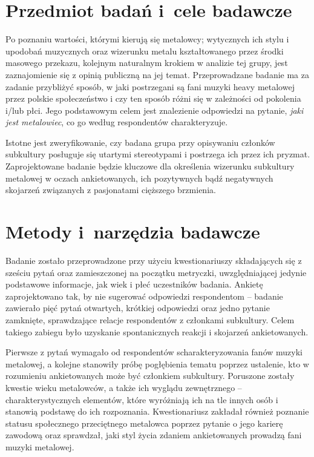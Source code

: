 \documentclass[12pt, a4paper, titlepage]{report}
\begin{document}
\section{Przedmiot badań i~cele badawcze}
Po poznaniu wartości, którymi kierują się metalowcy; wytycznych ich stylu i upodobań muzycznych oraz wizerunku metalu kształtowanego przez środki masowego przekazu, kolejnym naturalnym krokiem w analizie tej grupy, jest zaznajomienie się z opinią publiczną na jej temat. Przeprowadzane badanie ma za zadanie przybliżyć sposób, w jaki postrzegani są fani muzyki heavy metalowej przez polskie społeczeństwo i czy ten sposób różni się w zależności od pokolenia i/lub płci. Jego podstawowym celem jest znalezienie odpowiedzi na pytanie, \emph{jaki jest metalowiec}, co go według respondentów charakteryzuje. 

Istotne jest zweryfikowanie, czy badana grupa przy opisywaniu członków subkultury posługuje się utartymi stereotypami i postrzega ich przez ich pryzmat. Zaprojektowane badanie będzie kluczowe dla określenia wizerunku subkultury metalowej w oczach ankietowanych, ich pozytywnych bądź negatywnych skojarzeń związanych z pasjonatami cięższego brzmienia. 

\section{Metody i~narzędzia badawcze}
Badanie zostało przeprowadzone przy użyciu kwestionariuszy składających się z sześciu pytań oraz zamieszczonej na początku metryczki, uwzględniającej jedynie podstawowe informacje, jak wiek i płeć uczestników badania. Ankietę zaprojektowano tak, by nie sugerować odpowiedzi respondentom -- badanie zawierało pięć pytań otwartych, krótkiej odpowiedzi oraz jedno pytanie zamknięte, sprawdzające relacje respondentów z członkami subkultury. Celem takiego zabiegu było uzyskanie spontanicznych reakcji i skojarzeń ankietowanych. 

Pierwsze z pytań wymagało od respondentów scharakteryzowania fanów muzyki metalowej, a kolejne stanowiły próbę pogłębienia tematu poprzez ustalenie, kto w rozumieniu ankietowanych może być członkiem subkultury. Poruszone zostały kwestie wieku metalowców, a także ich wyglądu zewnętrznego -- charakterystycznych elementów, które wyróżniają ich na tle innych osób i stanowią podstawę do ich rozpoznania. Kwestionariusz zakładał również poznanie statusu społecznego przeciętnego metalowca poprzez pytanie o jego karierę zawodową oraz sprawdzał, jaki styl życia zdaniem ankietowanych prowadzą fani muzyki metalowej.
\end{document}
